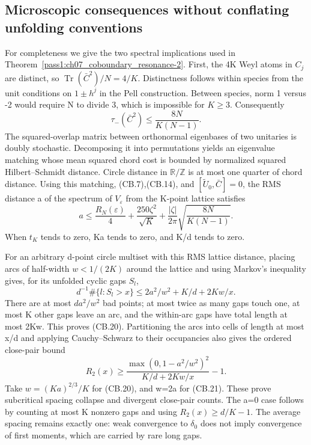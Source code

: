 \subsection{Microscopic consequences without conflating unfolding conventions}\label{coboundary:microscopic-consequences-without-conflating-unfolding-conventions}

For completeness we give the two spectral implications used in Theorem~\ref{pass1:ch07_coboundary_resonance-2}. First, the 4K Weyl atoms in \(C_{j}\) are distinct, so \(\operatorname{Tr}(\bar C^2)/N=4/K\). Distinctness follows within species from the unit conditions on \(1\pm h^j\) in the Pell construction. Between species, norm 1 versus -2 would require N to divide 3, which is impossible for \(K\geq3\). Consequently \[
 \tau_-(\bar C^2)\leq\frac{8N}{K(N-1)}.
\] The squared-overlap matrix between orthonormal eigenbases of two unitaries is doubly stochastic. Decomposing it into permutations yields an eigenvalue matching whose mean squared chord cost is bounded by normalized squared Hilbert--Schmidt distance. Circle distance in \(\mathbb R/\mathbb Z\) is at most one quarter of chord distance. Using this matching, (CB.7),(CB.14), and \([\widetilde U_0,\bar C]=0\), the RMS distance a of the spectrum of \(V_{\varepsilon}\) from the K-point lattice satisfies \[
 a\leq\frac{R_N(\varepsilon)}4+
          \frac{250\zeta^2}{\sqrt K}+
          \frac{|\zeta|}{2\pi}\sqrt{\frac{8N}{K(N-1)}}.         \tag{CB.19}
\] When \(t_{K}\) tends to zero, Ka tends to zero, and K/d tends to zero.

For an arbitrary d-point circle multiset with this RMS lattice distance, placing arcs of half-width \(w<1/(2K)\) around the lattice and using Markov's inequality gives, for its unfolded cyclic gaps \(S_{l}\), \[
 d^{-1}\#\{l:S_l>x\}\leq2a^2/w^2+K/d+2Kw/x.                  \tag{CB.20}
\] There are at most \(da^2/w^2\) bad points; at most twice as many gaps touch one, at most K other gaps leave an arc, and the within-arc gaps have total length at most 2Kw. This proves (CB.20). Partitioning the arcs into cells of length at most x/d and applying Cauchy--Schwarz to their occupancies also gives the ordered close-pair bound \[
 R_2(x)\geq\frac{\max(0,1-a^2/w^2)^2}{K/d+2Kw/x}-1.           \tag{CB.21}
\] Take \(w=(Ka)^{2/3}/K\) for (CB.20), and w=2a for (CB.21). These prove subcritical spacing collapse and divergent close-pair counts. The a=0 case follows by counting at most K nonzero gaps and using \(R_2(x)\geq d/K-1\). The average spacing remains exactly one: weak convergence to \(\delta_{0}\) does not imply convergence of first moments, which are carried by rare long gaps.


